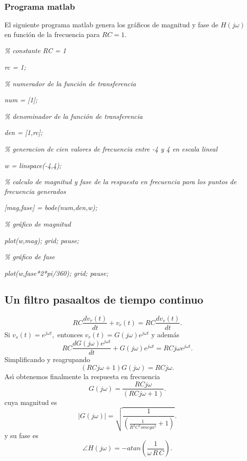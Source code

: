 \subsubsection{Programa matlab}

El siguiente programa matlab genera los gr\'{a}ficos de magnitud y fase de 
$H\left( j\omega \right) $ en funci\'{o}n de la frecuencia para $RC=1$.

\textit{\% constante RC = 1}

\textit{rc = 1;}

\textit{\% numerador de la funci\'{o}n de transferencia}

\textit{num = [1];}

\textit{\% denominador de la funci\'{o}n de transferencia}

\textit{den = [1,rc];}

\textit{\% generacion de cien valores de frecuencia entre -4 y 4 en escala
lineal}

\textit{w = linspace(-4,4);}

\textit{\% calculo de magnitud y fase de la respuesta en frecuencia para los
puntos de frecuencia generados}

\textit{[mag,fase] = bode(num,den,w);}

\textit{\% gr\'{a}fico de magnitud}

\textit{plot(w,mag); grid; pause;}

\textit{\% gr\'{a}fico de fase}

\textit{plot(w,fase*2*pi/360); grid; pause;}

\subsection{Un filtro pasaaltos de tiempo continuo}

\begin{equation}
        RC\frac{dv_{r}\left( t\right) }{dt}+v_{r}\left( t\right) =RC\frac{dv_{s}\left( t\right) }{dt}.
\end{equation}
Si $v_{s}\left( t\right) =e^{j\omega t},$ entonces 
$v_{r}\left( t\right)=G\left( j\omega \right) e^{j\omega t}$ y adem\'{a}s 
\begin{equation}
RC\frac{dG\left( j\omega \right) e^{j\omega t}}{dt}+
G\left( j\omega \right)e^{j\omega t}=RCj\omega e^{j\omega t}.
\end{equation}
Simplificando y reagrupando 
\begin{equation}
 \left( RCj\omega +1\right) G\left( j\omega \right) = R C j\omega .
\end{equation}
As\'{\i} obtenemos finalmente la respuesta en frecuencia 
\begin{equation}
  G\left( j\omega \right) =\frac{RCj\omega }{\left( RCj\omega +1\right) }.
\end{equation}
cuya magnitud es
\begin{equation}
| G\left( j\omega \right) | = \sqrt{\frac{1}{\left( \frac{1}{R^{2} C^{2} omega^{2}} +1\right)}}.
\end{equation}
y su fase es
\begin{equation}
\angle H\left(j \omega \right) = -atan(\frac{1}{\omega \, R \, C}).
\end{equation}

